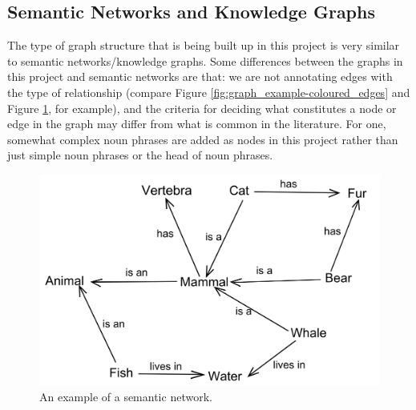 \documentclass[12pt]{article}
\theoremstyle{grammarstyle}
\begin{document}
\subsection{Semantic Networks and Knowledge Graphs}
The type of graph structure that is being built up in this project is very similar to semantic networks/knowledge graphs. Some differences between the graphs in this project and semantic networks are that: we are not annotating edges with the type of relationship (compare Figure \ref{fig:graph_example-coloured_edges} and Figure \ref{fig:semantic_network_example}, for example), and the criteria for deciding what constitutes a node or edge in the graph may differ from what is common in the literature. For one, somewhat complex noun phrases are added as nodes in this project rather than just simple noun phrases or the head of noun phrases.

\begin{figure}
    \centering
    \includegraphics[width=\linewidth]{reports/technical_report/latex/figures/semantic_map_example.png}
    \caption{An example of a semantic network.\protect\footnotemark}
    \label{fig:semantic_network_example}
\end{figure}


\end{document}
